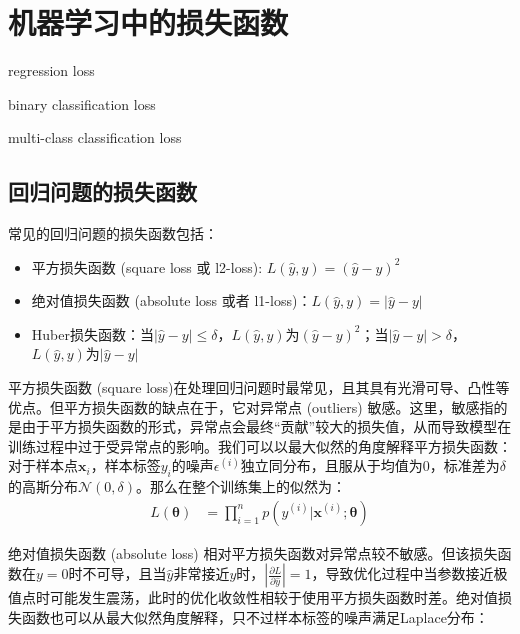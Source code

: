 \chapter{机器学习中的损失函数}

\begin{introduction}
  \item regression loss
  \item binary classification loss
  \item multi-class classification loss
  \end{introduction}

\section{回归问题的损失函数}

常见的回归问题的损失函数包括：
\begin{itemize}
  \item 平方损失函数 (square loss 或 l2-loss): $L(\hat{y}, y) = (\hat{y} - y)^2$
  \item 绝对值损失函数 (absolute loss 或者 l1-loss)：$L(\hat{y}, y) = |\hat{y} - y|$
  \item Huber损失函数：当$|\hat{y} - y|\leq\delta$，$L(\hat{y}, y)$为$(\hat{y} - y)^2$；当$|\hat{y} - y|>\delta$，$L(\hat{y}, y)$为$|\hat{y} - y|$
\end{itemize}

平方损失函数 (square loss)在处理回归问题时最常见，且其具有光滑可导、凸性等优点。但平方损失函数的缺点在于，它对异常点 (outliers) 敏感。这里，敏感指的是由于平方损失函数的形式，异常点会最终“贡献”较大的损失值，从而导致模型在训练过程中过于受异常点的影响。我们可以以最大似然的角度解释平方损失函数：对于样本点$\bm{x}_i$，样本标签$y_i$的噪声$\epsilon^{(i)}$独立同分布，且服从于均值为0，标准差为$\delta$的高斯分布$\mathcal{N}(0,\delta)$。那么在整个训练集上的似然为：
\begin{equation}
  \begin{aligned}
    L(\bm{\theta}) &= \prod_{i=1}^{n}{p(y^{(i)}|\bm{x}^{(i)};\bm{\theta})}
  \end{aligned}
\end{equation}

绝对值损失函数 (absolute loss) 相对平方损失函数对异常点较不敏感。但该损失函数在$y=0$时不可导，且当$\hat{y}$非常接近$y$时，$|\frac{\partial L}{\partial \hat{y}}|=1$，导致优化过程中当参数接近极值点时可能发生震荡，此时的优化收敛性相较于使用平方损失函数时差。绝对值损失函数也可以从最大似然角度解释，只不过样本标签的噪声满足Laplace分布：

